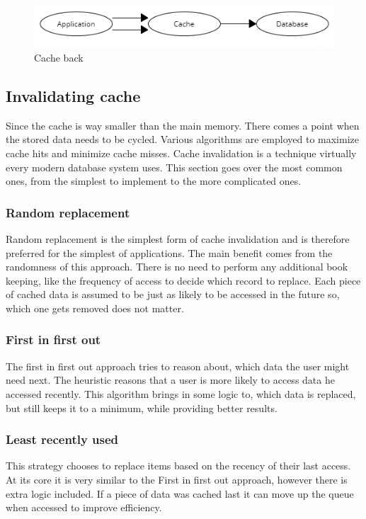 \documentclass[10pt,twoside,a4paper]{article}
\begin{document}
\begin{figure}[h]
    \centering
    \includegraphics[width=1\linewidth]{Cache-back.png}
    \caption{Cache back}
    \label{fig:cache-back}
\end{figure}

\subsection{Invalidating cache}
Since the cache is way smaller than the main memory. There comes a point when the stored data needs to be cycled\cite{Redis}. Various algorithms are employed\cite{755618} to maximize cache hits and minimize cache misses. Cache invalidation is a technique virtually every modern database system uses. This section goes over the most common ones, from the simplest to implement to the more complicated ones.

\subsubsection{Random replacement}
Random replacement is the simplest form of cache invalidation and is therefore preferred for the simplest of applications. The main benefit comes from the randomness of this approach. There is no need to perform any additional book keeping, like the frequency of access to decide which record to replace. Each piece of cached data is assumed to be just as likely to be accessed in the future so, which one gets removed does not matter.

\subsubsection{First in first out}
The first in first out approach tries to reason about, which data the user might need next. The heuristic reasons that a user is more likely to access data he accessed recently. This algorithm brings in some logic to, which data is replaced, but still keeps it to a minimum, while providing better results.

\subsubsection{Least recently used}
\label{sec:lru}
This strategy chooses to replace items based on the recency of their last access. At its core it is very similar to the First in first out approach, however there is extra logic included. If a piece of data was cached last it can move up the queue when accessed to improve efficiency.
\end{document}
